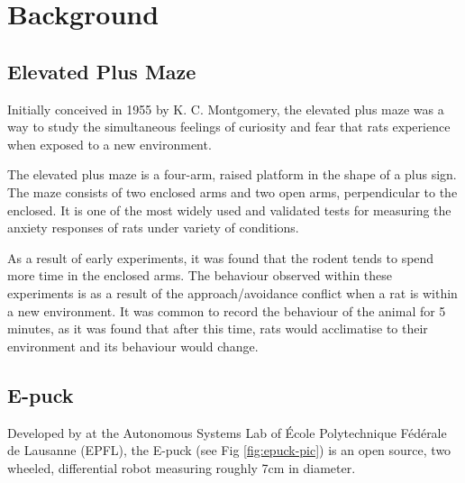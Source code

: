 \section{Background}


\subsection{Elevated Plus Maze}

Initially conceived in 1955 by K. C. Montgomery, the elevated plus maze was a way to study the simultaneous feelings of curiosity and fear that rats experience when exposed to a new environment. \cite{Montgomery1955}

The elevated plus maze is a four-arm, raised platform in the shape of a plus sign. The maze consists of two enclosed arms and two open arms, perpendicular to the enclosed. \cite{Carter2010} It is one of the most widely used and validated tests for measuring the anxiety responses of rats under variety of conditions. \cite{Walf2007}

As a result of early experiments, it was found that the rodent tends to spend more time in the enclosed arms. The behaviour observed within these experiments is as a result of the approach/avoidance conflict when a rat is within a new environment. \cite{Lister1987} It was common to record the behaviour of the animal for 5 minutes, as it was found that after this time, rats would acclimatise to their environment and its behaviour would change. \cite{Komada2008}

\subsection{E-puck}

Developed by \citeauthor{epfl-epuck} at the Autonomous Systems Lab of \'{E}cole Polytechnique F\'{e}d\'{e}rale de Lausanne (EPFL), the E-puck (see Fig \ref{fig:epuck-pic}) is  an open source, two wheeled, differential robot measuring roughly 7cm in diameter. \cite{epfl-epuck}

